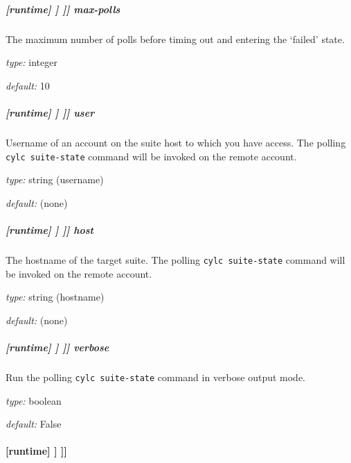 \subparagraph[max-polls]{[runtime] \textrightarrow [[\_\_NAME\_\_]] \textrightarrow [[[suite state polling]]] \textrightarrow max-polls}

The maximum number of polls before timing out and entering the `failed' state.

\begin{myitemize}
    \item {\em type:} integer
    \item {\em default:} 10
\end{myitemize}

\subparagraph[user]{[runtime] \textrightarrow [[\_\_NAME\_\_]] \textrightarrow [[[suite state polling]]] \textrightarrow user}

Username of an account on the suite host to which you have access. The
polling \lstinline=cylc suite-state= command will be invoked
on the remote account.

\begin{myitemize}
    \item {\em type:} string (username)
    \item {\em default:} (none)
\end{myitemize}

\subparagraph[host]{[runtime] \textrightarrow [[\_\_NAME\_\_]] \textrightarrow [[[suite state polling]]] \textrightarrow host}

The hostname of the target suite. The polling \lstinline=cylc suite-state= command
will be invoked on the remote account.

\begin{myitemize}
    \item {\em type:} string (hostname)
    \item {\em default:} (none)
\end{myitemize}

\subparagraph[verbose]{[runtime] \textrightarrow [[\_\_NAME\_\_]] \textrightarrow [[[suite state polling]]] \textrightarrow verbose}

Run the polling \lstinline=cylc suite-state= command in verbose output mode.

\begin{myitemize}
    \item {\em type:} boolean
    \item {\em default:} False
\end{myitemize}

\paragraph[{[[[}simulation{]]]}]{[runtime] \textrightarrow [[\_\_NAME\_\_]] \textrightarrow [[[simulation]]]}
\label{suiterc-sim-config}

